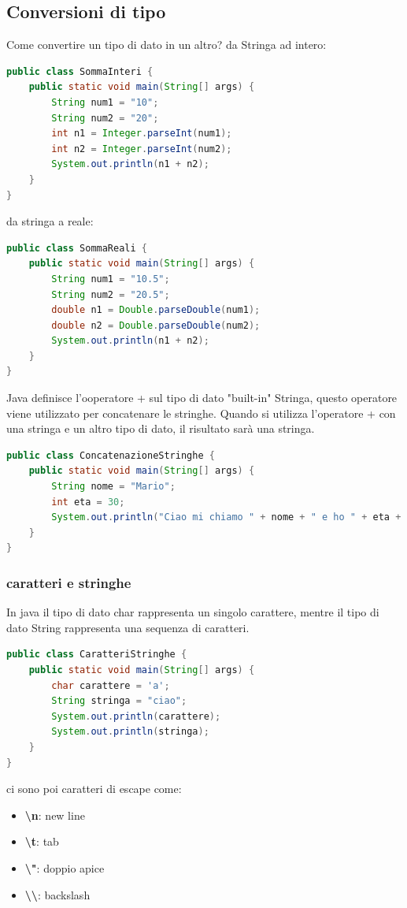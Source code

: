 \documentclass[11pt]{article}
\begin{document}
\subsection{Conversioni di tipo}
Come convertire un tipo di dato in un altro?
da Stringa ad intero:
\begin{lstlisting}[language=Java]
public class SommaInteri {
    public static void main(String[] args) {
        String num1 = "10";
        String num2 = "20";
        int n1 = Integer.parseInt(num1);
        int n2 = Integer.parseInt(num2);
        System.out.println(n1 + n2);
    }
}
\end{lstlisting}
da stringa a reale:
\begin{lstlisting}[language=Java]
public class SommaReali {
    public static void main(String[] args) {
        String num1 = "10.5";
        String num2 = "20.5";
        double n1 = Double.parseDouble(num1);
        double n2 = Double.parseDouble(num2);
        System.out.println(n1 + n2);
    }
}
\end{lstlisting}

Java definisce l'ooperatore + sul tipo di dato "built-in" Stringa, questo operatore viene utilizzato per concatenare le stringhe.
Quando si utilizza l'operatore + con una stringa e un altro tipo di dato, il risultato sarà una stringa.
\begin{lstlisting}[language=Java]
public class ConcatenazioneStringhe {
    public static void main(String[] args) {
        String nome = "Mario";
        int eta = 30;
        System.out.println("Ciao mi chiamo " + nome + " e ho " + eta + " anni");
    }
}
\end{lstlisting}

\subsubsection{caratteri e stringhe}
In java il tipo di dato char rappresenta un singolo carattere, mentre il tipo di dato String rappresenta una sequenza di caratteri.
\begin{lstlisting}[language=Java]
public class CaratteriStringhe {
    public static void main(String[] args) {
        char carattere = 'a';
        String stringa = "ciao";
        System.out.println(carattere);
        System.out.println(stringa);
    }
}
\end{lstlisting}
ci sono poi caratteri di escape come:
\begin{itemize}
    \item \textbf{\textbackslash n}: new line
    \item \textbf{\textbackslash t}: tab
    \item \textbf{\textbackslash "}: doppio apice
    \item \textbf{\textbackslash \textbackslash}: backslash
    \end{itemize}
\end{document}
